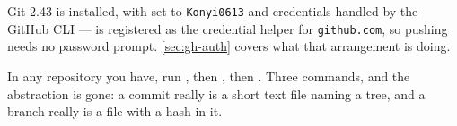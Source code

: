 \begin{note}
	Git 2.43 is installed, with  set to \texttt{Konyi0613} and
	credentials handled by the GitHub CLI ---  is
	registered as the credential helper for \texttt{github.com}, so pushing needs
	no password prompt. \autoref{sec:gh-auth} covers what that arrangement is
	doing.
\end{note}

\begin{tryit}
	In any repository you have, run , then
	, then .
	Three commands, and the abstraction is gone: a commit really is a short text
	file naming a tree, and a branch really is a file with a hash in it.
\end{tryit}
